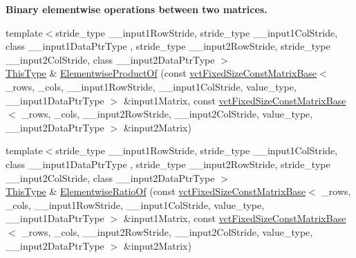 \begin{Indent}{\bf Binary elementwise operations between two matrices.}
\begin{DoxyCompactItemize}
{\footnotesize template$<$stride\+\_\+type \+\_\+\+\_\+input1\+Row\+Stride, stride\+\_\+type \+\_\+\+\_\+input1\+Col\+Stride, class \+\_\+\+\_\+input1\+Data\+Ptr\+Type , stride\+\_\+type \+\_\+\+\_\+input2\+Row\+Stride, stride\+\_\+type \+\_\+\+\_\+input2\+Col\+Stride, class \+\_\+\+\_\+input2\+Data\+Ptr\+Type $>$ }\\\hyperlink{classvct_fixed_size_const_matrix_base_a7ec66a96ed7e08ce9ff54093133c9d8d}{This\+Type} \& \hyperlink{classvct_fixed_size_matrix_base_abd211cd69b870681f1a3110df2ad501c}{Elementwise\+Product\+Of} (const \hyperlink{classvct_fixed_size_const_matrix_base}{vct\+Fixed\+Size\+Const\+Matrix\+Base}$<$ \+\_\+rows, \+\_\+cols, \+\_\+\+\_\+input1\+Row\+Stride, \+\_\+\+\_\+input1\+Col\+Stride, value\+\_\+type, \+\_\+\+\_\+input1\+Data\+Ptr\+Type $>$ \&input1\+Matrix, const \hyperlink{classvct_fixed_size_const_matrix_base}{vct\+Fixed\+Size\+Const\+Matrix\+Base}$<$ \+\_\+rows, \+\_\+cols, \+\_\+\+\_\+input2\+Row\+Stride, \+\_\+\+\_\+input2\+Col\+Stride, value\+\_\+type, \+\_\+\+\_\+input2\+Data\+Ptr\+Type $>$ \&input2\+Matrix)
\item 
{\footnotesize template$<$stride\+\_\+type \+\_\+\+\_\+input1\+Row\+Stride, stride\+\_\+type \+\_\+\+\_\+input1\+Col\+Stride, class \+\_\+\+\_\+input1\+Data\+Ptr\+Type , stride\+\_\+type \+\_\+\+\_\+input2\+Row\+Stride, stride\+\_\+type \+\_\+\+\_\+input2\+Col\+Stride, class \+\_\+\+\_\+input2\+Data\+Ptr\+Type $>$ }\\\hyperlink{classvct_fixed_size_const_matrix_base_a7ec66a96ed7e08ce9ff54093133c9d8d}{This\+Type} \& \hyperlink{classvct_fixed_size_matrix_base_a0c8ec33d941089d54ffe302a922f1362}{Elementwise\+Ratio\+Of} (const \hyperlink{classvct_fixed_size_const_matrix_base}{vct\+Fixed\+Size\+Const\+Matrix\+Base}$<$ \+\_\+rows, \+\_\+cols, \+\_\+\+\_\+input1\+Row\+Stride, \+\_\+\+\_\+input1\+Col\+Stride, value\+\_\+type, \+\_\+\+\_\+input1\+Data\+Ptr\+Type $>$ \&input1\+Matrix, const \hyperlink{classvct_fixed_size_const_matrix_base}{vct\+Fixed\+Size\+Const\+Matrix\+Base}$<$ \+\_\+rows, \+\_\+cols, \+\_\+\+\_\+input2\+Row\+Stride, \+\_\+\+\_\+input2\+Col\+Stride, value\+\_\+type, \+\_\+\+\_\+input2\+Data\+Ptr\+Type $>$ \&input2\+Matrix)
\item 

\end{DoxyCompactItemize}
\end{Indent}
